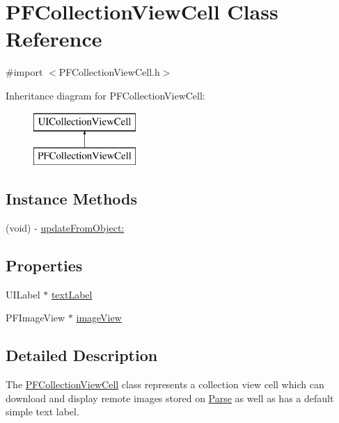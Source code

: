 \hypertarget{interface_p_f_collection_view_cell}{}\section{P\+F\+Collection\+View\+Cell Class Reference}
\label{interface_p_f_collection_view_cell}


{\ttfamily \#import $<$P\+F\+Collection\+View\+Cell.\+h$>$}

Inheritance diagram for P\+F\+Collection\+View\+Cell\+:\begin{figure}[H]
\begin{center}
\leavevmode
\includegraphics[height=2.000000cm]{interface_p_f_collection_view_cell}
\end{center}
\end{figure}
\subsection*{Instance Methods}
\begin{DoxyCompactItemize}
\item 
(void) -\/ \hyperlink{interface_p_f_collection_view_cell_af559fdc11609064724577a2c0366752d}{update\+From\+Object\+:}
\end{DoxyCompactItemize}
\subsection*{Properties}
\begin{DoxyCompactItemize}
\item 
U\+I\+Label $\ast$ \hyperlink{interface_p_f_collection_view_cell_a7b74bb02a74dc52ce87a7b6b45d9feaf}{text\+Label}
\item 
P\+F\+Image\+View $\ast$ \hyperlink{interface_p_f_collection_view_cell_a8731a5d627f633ddd94e025606eafe72}{image\+View}
\end{DoxyCompactItemize}


\subsection{Detailed Description}
The {\ttfamily \hyperlink{interface_p_f_collection_view_cell}{P\+F\+Collection\+View\+Cell}} class represents a collection view cell which can download and display remote images stored on \hyperlink{interface_parse}{Parse} as well as has a default simple text label. 

